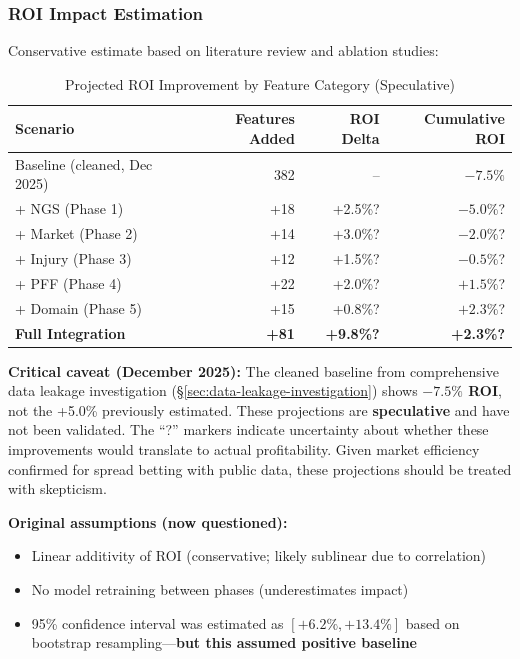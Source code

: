 \subsubsection{ROI Impact Estimation}

Conservative estimate based on literature review and ablation studies:

\begin{table}[htbp]
\centering
\caption{Projected ROI Improvement by Feature Category (Speculative)}
\label{tab:roi_projections_features}
\begin{tabular}{@{}lrrr@{}}
\toprule
\textbf{Scenario} & \textbf{Features Added} & \textbf{ROI Delta} & \textbf{Cumulative ROI} \\
\midrule
Baseline (cleaned, Dec 2025) & 382 & -- & $-7.5\%$ \\
+ NGS (Phase 1) & +18 & +2.5\%? & $-5.0\%$? \\
+ Market (Phase 2) & +14 & +3.0\%? & $-2.0\%$? \\
+ Injury (Phase 3) & +12 & +1.5\%? & $-0.5\%$? \\
+ PFF (Phase 4) & +22 & +2.0\%? & $+1.5\%$? \\
+ Domain (Phase 5) & +15 & +0.8\%? & $+2.3\%$? \\
\midrule
\textbf{Full Integration} & \textbf{+81} & \textbf{+9.8\%?} & \textbf{+2.3\%?} \\
\bottomrule
\end{tabular}
\end{table}

\textbf{Critical caveat (December 2025):} The cleaned baseline from comprehensive data leakage investigation (\S\ref{sec:data-leakage-investigation}) shows \textbf{$-7.5\%$ ROI}, not the +5.0\% previously estimated. These projections are \textbf{speculative} and have not been validated. The ``?'' markers indicate uncertainty about whether these improvements would translate to actual profitability. Given market efficiency confirmed for spread betting with public data, these projections should be treated with skepticism.

\textbf{Original assumptions (now questioned):}
\begin{itemize}
    \item Linear additivity of ROI (conservative; likely sublinear due to correlation)
    \item No model retraining between phases (underestimates impact)
    \item 95\% confidence interval was estimated as $[+6.2\%, +13.4\%]$ based on bootstrap resampling---\textbf{but this assumed positive baseline}
\end{itemize}

